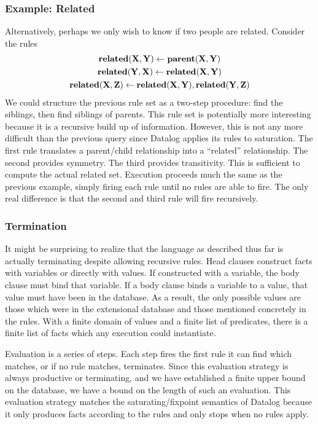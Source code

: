 \subsubsection{Example: Related}
Alternatively, perhaps we only wish to know if two people are related.
Consider the rules
\begin{gather*}
        {\bf related}({\bf X}, {\bf Y}) \leftarrow {\bf parent}({\bf X}, {\bf Y})\\
        {\bf related}({\bf Y}, {\bf X}) \leftarrow {\bf related}({\bf X}, {\bf Y})\\
        {\bf related}({\bf X}, {\bf Z}) \leftarrow {\bf related}({\bf X}, {\bf Y}), {\bf related}({\bf Y}, {\bf Z})
\end{gather*}
We could structure the previous rule set as a two-step procedure: find the siblings, then find siblings of parents.
This rule set is potentially more interesting because it is a recursive build up of information.
However, this is not any more difficult than the previous query since Datalog applies its rules to saturation.
The first rule translates a parent/child relationship into a ``related'' relationship.
The second provides symmetry.
The third provides transitivity.
This is sufficient to compute the actual related set.
Execution proceeds much the same as the previous example, simply firing each rule until no rules are able to fire.
The only real difference is that the second and third rule will fire recursively.
\subsubsection{Termination}
It might be surprising to realize that the language as described thus far is actually terminating despite allowing recursive rules.
Head clauses construct facts with variables or directly with values.
If constructed with a variable, the body clause must bind that variable.
If a body clause binds a variable to a value, that value must have been in the database.
As a result, the only possible values are those which were in the extensional database and those mentioned concretely in the rules.
With a finite domain of values and a finite list of predicates, there is a finite list of facts which any execution could instantiate.

Evaluation is a series of steps.
Each step fires the first rule it can find which matches, or if no rule matches, terminates.
Since this evaluation strategy is always productive or terminating, and we have established a finite upper bound on the database, we have a bound on the length of such an evaluation.
This evaluation strategy matches the saturating/fixpoint semantics of Datalog because it only produces facts according to the rules and only stops when no rules apply.

